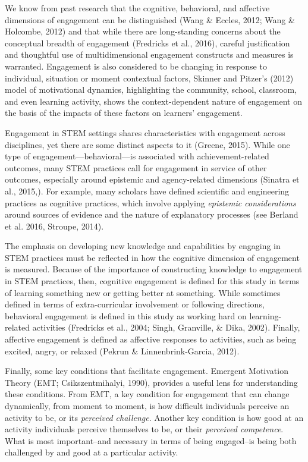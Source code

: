 \documentclass[]{book}
\theoremstyle{definition}
\theoremstyle{definition}
\theoremstyle{definition}
\theoremstyle{remark}
\begin{document}
We know from past research that the cognitive, behavioral, and affective
dimensions of engagement can be distinguished (Wang \& Eccles, 2012;
Wang \& Holcombe, 2012) and that while there are long-standing concerns
about the conceptual breadth of engagement (Fredricks et al., 2016),
careful justification and thoughtful use of multidimensional engagement
constructs and measures is warranted. Engagement is also considered to
be changing in response to individual, situation or moment contextual
factors, Skinner and Pitzer's (2012) model of motivational dynamics,
highlighting the community, school, classroom, and even learning
activity, shows the context-dependent nature of engagement on the basis
of the impacts of these factors on learners' engagement.

Engagement in STEM settings shares characteristics with engagement
across disciplines, yet there are some distinct aspects to it (Greene,
2015). While one type of engagement---behavioral---is associated with
achievement-related outcomes, many STEM practices call for engagement in
service of other outcomes, especially around epistemic and
agency-related dimensions (Sinatra et al., 2015,). For example, many
scholars have defined scientific and engineering practices as cognitive
practices, which involve applying \emph{epistemic considerations} around
sources of evidence and the nature of explanatory processes (see Berland
et al. 2016, Stroupe, 2014).

The emphasis on developing new knowledge and capabilities by engaging in
STEM practices must be reflected in how the cognitive dimension of
engagement is measured. Because of the importance of constructing
knowledge to engagement in STEM practices, then, cognitive engagement is
defined for this study in terms of learning something new or getting
better at something. While sometimes defined in terms of
extra-curricular involvement or following directions, behavioral
engagement is defined in this study as working hard on learning-related
activities (Fredricks et al., 2004; Singh, Granville, \& Dika, 2002).
Finally, affective engagement is defined as affective responses to
activities, such as being excited, angry, or relaxed (Pekrun \&
Linnenbrink-Garcia, 2012).

Finally, some key conditions that facilitate engagement. Emergent
Motivation Theory (EMT; Csikszentmihalyi, 1990), provides a useful lens
for understanding these conditions. From EMT, a key condition for
engagement that can change dynamically, from moment to moment, is how
difficult individuals perceive an activity to be, or its \emph{perceived
challenge}. Another key condition is how good at an activity individuals
perceive themselves to be, or their \emph{perceived competence}. What is
most important--and necessary in terms of being engaged--is being both
challenged by and good at a particular activity.
\end{document}
